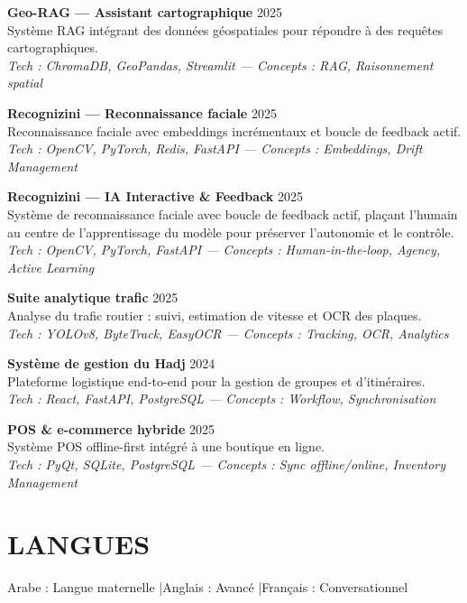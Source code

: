 \documentclass[a4paper,12pt]{article}
\begin{document}
{\textbf{Geo-RAG — Assistant cartographique} \hfill 2025 \\
Système RAG intégrant des données géospatiales pour répondre à des requêtes cartographiques. \\
\textit{Tech : ChromaDB, GeoPandas, Streamlit — Concepts : RAG, Raisonnement spatial}

\textbf{Recognizini — Reconnaissance faciale} \hfill 2025 \\
Reconnaissance faciale avec embeddings incrémentaux et boucle de feedback actif. \\
\textit{Tech : OpenCV, PyTorch, Redis, FastAPI — Concepts : Embeddings, Drift Management}

\textbf{Recognizini — IA Interactive \& Feedback} \hfill 2025 \\
Système de reconnaissance faciale avec boucle de feedback actif, plaçant l'humain au centre de l'apprentissage du modèle pour préserver l'autonomie et le contrôle. \\
\textit{Tech : OpenCV, PyTorch, FastAPI — Concepts : Human-in-the-loop, Agency, Active Learning}

\textbf{Suite analytique trafic} \hfill 2025 \\
Analyse du trafic routier : suivi, estimation de vitesse et OCR des plaques. \\
\textit{Tech : YOLOv8, ByteTrack, EasyOCR — Concepts : Tracking, OCR, Analytics}

\textbf{Système de gestion du Hadj} \hfill 2024 \\
Plateforme logistique end-to-end pour la gestion de groupes et d’itinéraires. \\
\textit{Tech : React, FastAPI, PostgreSQL — Concepts : Workflow, Synchronisation}

\textbf{POS \& e-commerce hybride} \hfill 2025 \\
Système POS offline-first intégré à une boutique en ligne. \\
\textit{Tech : PyQt, SQLite, PostgreSQL — Concepts : Sync offline/online, Inventory Management}
}

\section{LANGUES}
Arabe : Langue maternelle \quad|\quad Anglais : Avancé \quad|\quad Français : Conversationnel
\end{document}
